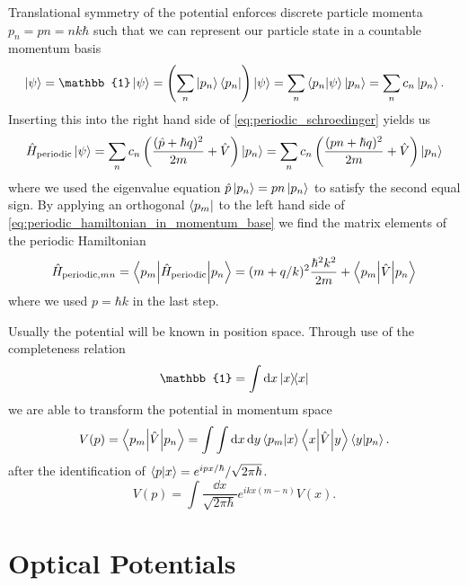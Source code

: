 Translational symmetry of the potential enforces discrete particle momenta
$p_n=pn=nk\hbar$ such that we can represent our particle state in a
countable momentum basis
\begin{equation}
  \ket{\psi}
  =\mathbb{1}\ket{\psi}
  =\left(\sum_n\ket{p_n}\bra{p_n}\right)\ket{\psi}
  =\sum_n\braket{p_n}{\psi}\ket{p_n}
  =\sum_nc_n\ket{p_n}
  \label{eq:countable_momentum_state}.
\end{equation}
Inserting this into the right hand side of \cref{eq:periodic_schroedinger}
yields us
\begin{equation}
  \hat{H}_\text{periodic}\ket{\psi}
  =\sum_nc_n\left(\frac{(\hat{p}+\hbar q)^2}{2m}+\hat{V}\right)\ket{p_n}
  =\sum_nc_n\left(\frac{(pn+\hbar q)^2}{2m}+\hat{V}\right)\ket{p_n}
  \label{eq:periodic_hamiltonian_in_momentum_base}
\end{equation}
where we used the eigenvalue equation $\hat{p}\ket{p_n}=pn\ket{p_n}$ to
satisfy the second equal sign. By applying an orthogonal $\bra{p_m}$ to the
left hand side of \cref{eq:periodic_hamiltonian_in_momentum_base} we find
the matrix elements of the periodic Hamiltonian
\begin{equation}
  \hat{H}_{\text{periodic},mn}
  =\mel**{p_m}{\hat{H}_\text{periodic}}{p_n}
  =(m+q/k)^2\frac{\hbar^2k^2}{2m}+\mel**{p_m}{\hat{V}}{p_n}
  \label{eq:periodic_hamiltonian_momentum_elements}
\end{equation}
where we used $p=\hbar k$ in the last step.

Usually the potential will be known in position space. Through use of the
completeness relation
\begin{equation}
  \mathbb{1}
  =\int\dd{x}\op{x}{x}
  \label{eq:continous_completeness_relation}
\end{equation}
we are able to transform the potential in momentum space
\begin{align*}
  V(p)
  =\mel**{p_m}{\hat{V}}{p_n}
  =\int\int\dd{x}\dd{y}\braket{p_m}{x}\mel**{x}{\hat{V}}{y}\braket{y}{p_n}.
\end{align*}
after the identification of $\braket{p}{x}=e^{ipx/\hbar}/\sqrt{2\pi\hbar}$.
\begin{equation}
  V(p)
  =\int\frac{\dd{x}}{\sqrt{2\pi\hbar}}e^{ikx(m-n)}V(x)
  \label{eq:potential_fourier_transform}.
\end{equation}

\section{Optical Potentials}

